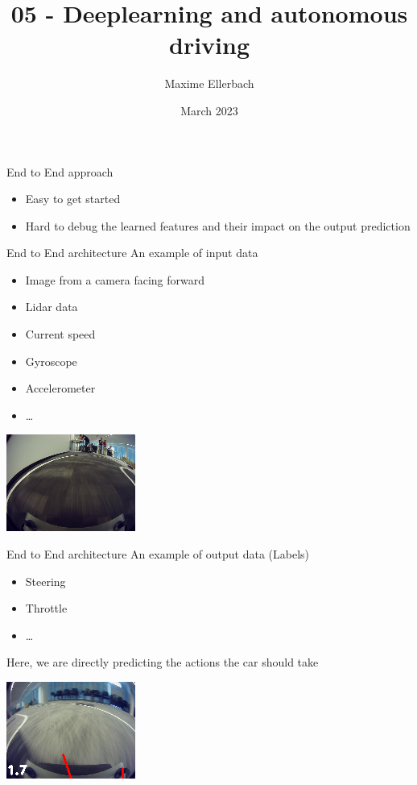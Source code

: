 \documentclass{beamer}
\title{05 - Deeplearning and autonomous driving}
\author{Maxime Ellerbach}
\date{March 2023}
\begin{document}
\begin{frame}
    \titlepage
\end{frame}


\begin{frame}{End to End approach}
    \begin{itemize}
        \item Easy to get started
        \item Hard to debug the learned features and their impact on the output prediction
    \end{itemize}
\end{frame}

\begin{frame}{End to End architecture}
    An example of input data
    \begin{itemize}
        \item Image from a camera facing forward
        \item Lidar data
        \item Current speed
        \item Gyroscope
        \item Accelerometer
        \item \ldots
    \end{itemize}

    \centering
    \includegraphics[height=0.4\textheight]{data/real-camera.png}

\end{frame}


\begin{frame}{End to End architecture}
    An example of output data (Labels)
    \begin{itemize}
        \item Steering
        \item Throttle
        \item \ldots
    \end{itemize}
    Here, we are directly predicting the actions the car should take

    \centering
    \includegraphics[height=0.4\textheight]{data/left-turn.png}
    
\end{frame}
\end{document}
